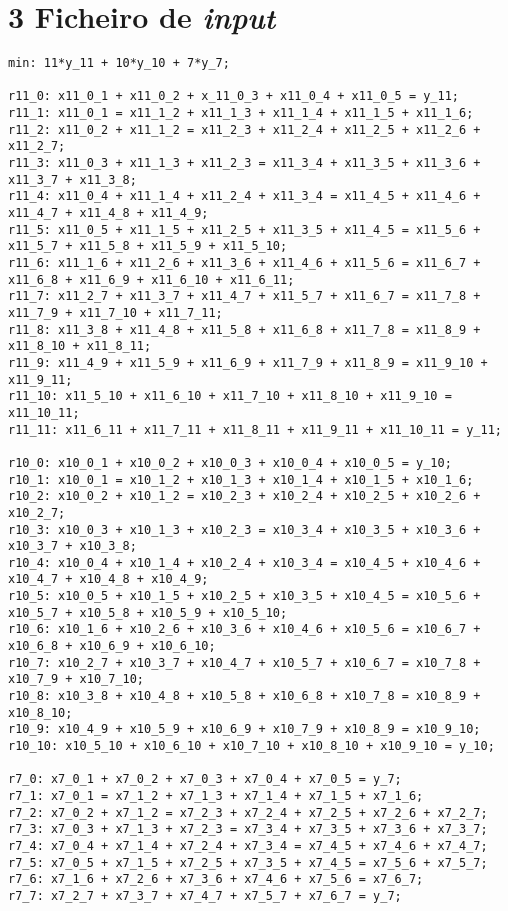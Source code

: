 \documentclass[a4paper,12pt]{article}
\begin{document}
\section*{3 Ficheiro de \textit{input}}
\begin{lstlisting}
min: 11*y_11 + 10*y_10 + 7*y_7;

r11_0: x11_0_1 + x11_0_2 + x_11_0_3 + x11_0_4 + x11_0_5 = y_11;
r11_1: x11_0_1 = x11_1_2 + x11_1_3 + x11_1_4 + x11_1_5 + x11_1_6;
r11_2: x11_0_2 + x11_1_2 = x11_2_3 + x11_2_4 + x11_2_5 + x11_2_6 + x11_2_7;
r11_3: x11_0_3 + x11_1_3 + x11_2_3 = x11_3_4 + x11_3_5 + x11_3_6 + x11_3_7 + x11_3_8;
r11_4: x11_0_4 + x11_1_4 + x11_2_4 + x11_3_4 = x11_4_5 + x11_4_6 + x11_4_7 + x11_4_8 + x11_4_9;
r11_5: x11_0_5 + x11_1_5 + x11_2_5 + x11_3_5 + x11_4_5 = x11_5_6 + x11_5_7 + x11_5_8 + x11_5_9 + x11_5_10;
r11_6: x11_1_6 + x11_2_6 + x11_3_6 + x11_4_6 + x11_5_6 = x11_6_7 + x11_6_8 + x11_6_9 + x11_6_10 + x11_6_11;
r11_7: x11_2_7 + x11_3_7 + x11_4_7 + x11_5_7 + x11_6_7 = x11_7_8 + x11_7_9 + x11_7_10 + x11_7_11;
r11_8: x11_3_8 + x11_4_8 + x11_5_8 + x11_6_8 + x11_7_8 = x11_8_9 + x11_8_10 + x11_8_11;
r11_9: x11_4_9 + x11_5_9 + x11_6_9 + x11_7_9 + x11_8_9 = x11_9_10 + x11_9_11;
r11_10: x11_5_10 + x11_6_10 + x11_7_10 + x11_8_10 + x11_9_10 = x11_10_11;
r11_11: x11_6_11 + x11_7_11 + x11_8_11 + x11_9_11 + x11_10_11 = y_11;

r10_0: x10_0_1 + x10_0_2 + x10_0_3 + x10_0_4 + x10_0_5 = y_10;
r10_1: x10_0_1 = x10_1_2 + x10_1_3 + x10_1_4 + x10_1_5 + x10_1_6;
r10_2: x10_0_2 + x10_1_2 = x10_2_3 + x10_2_4 + x10_2_5 + x10_2_6 + x10_2_7;
r10_3: x10_0_3 + x10_1_3 + x10_2_3 = x10_3_4 + x10_3_5 + x10_3_6 + x10_3_7 + x10_3_8;
r10_4: x10_0_4 + x10_1_4 + x10_2_4 + x10_3_4 = x10_4_5 + x10_4_6 + x10_4_7 + x10_4_8 + x10_4_9;
r10_5: x10_0_5 + x10_1_5 + x10_2_5 + x10_3_5 + x10_4_5 = x10_5_6 + x10_5_7 + x10_5_8 + x10_5_9 + x10_5_10;
r10_6: x10_1_6 + x10_2_6 + x10_3_6 + x10_4_6 + x10_5_6 = x10_6_7 + x10_6_8 + x10_6_9 + x10_6_10;
r10_7: x10_2_7 + x10_3_7 + x10_4_7 + x10_5_7 + x10_6_7 = x10_7_8 + x10_7_9 + x10_7_10;
r10_8: x10_3_8 + x10_4_8 + x10_5_8 + x10_6_8 + x10_7_8 = x10_8_9 + x10_8_10;
r10_9: x10_4_9 + x10_5_9 + x10_6_9 + x10_7_9 + x10_8_9 = x10_9_10;
r10_10: x10_5_10 + x10_6_10 + x10_7_10 + x10_8_10 + x10_9_10 = y_10;

r7_0: x7_0_1 + x7_0_2 + x7_0_3 + x7_0_4 + x7_0_5 = y_7;
r7_1: x7_0_1 = x7_1_2 + x7_1_3 + x7_1_4 + x7_1_5 + x7_1_6;
r7_2: x7_0_2 + x7_1_2 = x7_2_3 + x7_2_4 + x7_2_5 + x7_2_6 + x7_2_7;
r7_3: x7_0_3 + x7_1_3 + x7_2_3 = x7_3_4 + x7_3_5 + x7_3_6 + x7_3_7;
r7_4: x7_0_4 + x7_1_4 + x7_2_4 + x7_3_4 = x7_4_5 + x7_4_6 + x7_4_7;
r7_5: x7_0_5 + x7_1_5 + x7_2_5 + x7_3_5 + x7_4_5 = x7_5_6 + x7_5_7;
r7_6: x7_1_6 + x7_2_6 + x7_3_6 + x7_4_6 + x7_5_6 = x7_6_7;
r7_7: x7_2_7 + x7_3_7 + x7_4_7 + x7_5_7 + x7_6_7 = y_7;


\end{lstlisting}
\end{document}
